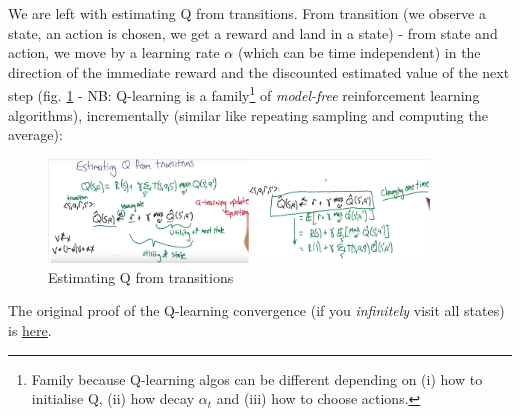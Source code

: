 \documentclass[11pt]{article}
\begin{document}
We are left with estimating Q from transitions. From transition (we observe a state, an action is chosen, we get a reward and land in a state) - from state and action, we move by a learning rate $\alpha$ (which can be time independent) in the direction of the immediate reward and the discounted estimated value of the next step (fig. \ref{estimating_Q} - NB: Q-learning is a family\footnote{Family because Q-learning algos can be different depending on (i) how to initialise Q, (ii) how decay $\alpha_t$ and (iii) how to choose actions.} of \textit{model-free} reinforcement learning algorithms), incrementally (similar like repeating sampling  and computing the average):
\begin{figure}[htbp] 
	\centering
	\includegraphics[width=0.9\textwidth]{pics/estimating_Q}
	\caption{Estimating Q from transitions} 
	\label{estimating_Q}
\end{figure}
The original proof of the Q-learning convergence (if you \textit{infinitely} visit all states) is \href{http://www.gatsby.ucl.ac.uk/~dayan/papers/cjch.pdf}{here}.
\end{document}
